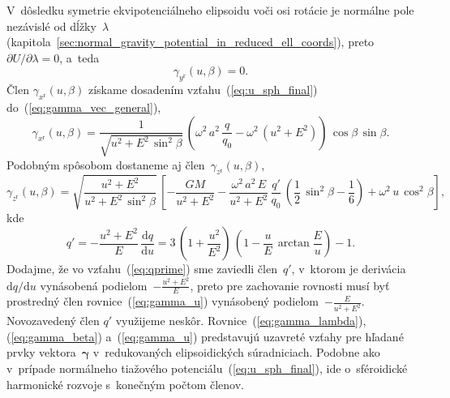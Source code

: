 \documentclass[a4paper, 12pt]{book}
\newcommand{\diff}{\mathrm d}
\begin{document}
V~dôsledku symetrie ekvipotenciálneho elipsoidu voči osi rotácie je normálne 
pole nezávislé od dĺžky~$\lambda$ 
(kapitola~\ref{sec:normal_gravity_potential_in_reduced_ell_coords}), 
preto~$\partial U \slash \partial \lambda = 0$, a~teda
%
\begin{equation}
\label{eq:gamma_lambda}
\gamma_{y^\mathrm{r}}(u, \beta) = 0{.}
\end{equation}
%
Člen $\gamma_{x^\mathrm{r}}(u, \beta)$ získame dosadením 
vzťahu~(\ref{eq:u_sph_final}) do~(\ref{eq:gamma_vec_general}),
%
\begin{equation}
\label{eq:gamma_beta}
\gamma_{x^\mathrm{r}}(u, \beta) = \frac{1}{\sqrt{u^2 + E^2 \, \sin^2\beta}} \, 
\left( \omega^2 \, a^2 \, \frac{q}{q_0} - \omega^2 \, (u^2 + E^2) \right) \, 
\cos\beta \, \sin\beta{.}
\end{equation}
%
Podobným spôsobom dostaneme aj člen~$\gamma_{z^\mathrm{r}}(u, \beta)$,
%
\begin{equation}
\label{eq:gamma_u}
\gamma_{z^\mathrm{r}}(u, \beta) = \sqrt{\dfrac{u^2 + E^2}{u^2 + E^2 \, 
\sin^2\beta}} \, \left[ -\frac{GM}{u^2 + E^2} - \frac{\omega^2 \, a^2 \, E}{u^2 
+ E^2} \, \frac{q'}{q_0} \, \left( \frac{1}{2} \, \sin^2\beta - \frac{1}{6} 
\right) + \omega^2 \, u \, \cos^2\beta \right]{,}
\end{equation}
%
kde \parencite{MoritzPhysicalGeodesy}
%
\begin{equation}
\label{eq:qprime}
q' = -\frac{u^2 + E^2}{E} \, \frac{\diff q}{\diff u} = 3 \, \left( 
1 + \frac{u^2}{E^2} \right) \, \left(  1 - \frac{u}{E} \, \arctan\frac{E}{u} 
\right) - 1{.}
\end{equation}
%
Dodajme, že vo vzťahu~(\ref{eq:qprime}) sme zaviedli člen~$q'$, v~ktorom je 
derivácia~$\diff q \slash \diff u$ vynásobená podielom~$-\frac{u^2 + E^2}{E}$, 
preto pre zachovanie rovnosti musí byť prostredný člen 
rovnice~(\ref{eq:gamma_u}) vynásobený podielom~$-\frac{E}{u^2 + E^2}$.  
Novozavedený člen $q'$ využijeme neskôr.  Rovnice~(\ref{eq:gamma_lambda}), 
(\ref{eq:gamma_beta}) a~(\ref{eq:gamma_u}) predstavujú uzavreté vzťahy pre 
hľadané prvky vektora~$\boldsymbol \gamma$ v~redukovaných elipsoidických 
súradniciach.  Podobne ako v~prípade normálneho tiažového 
potenciálu~(\ref{eq:u_sph_final}), ide o~sféroidické harmonické rozvoje 
s~konečným počtom členov.
\end{document}
